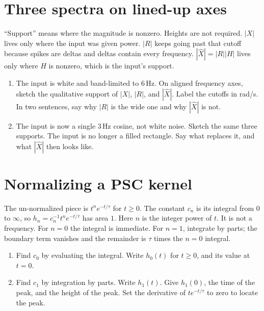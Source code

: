 \documentclass[11pt,letterpaper]{article}
\begin{document}
\section{Three spectra on lined-up axes}

\begin{idea}
``Support'' means where the magnitude is nonzero. Heights are not required. $|X|$ lives only where the input was given power. $|R|$ keeps going past that cutoff because spikes are deltas and deltas contain every frequency. $|\hat{X}| = |R||H|$ lives only where $H$ is nonzero, which is the input's support.
\end{idea}

\begin{enumerate}
\item The input is white and band-limited to $6\,\mathrm{Hz}$. On aligned frequency axes, sketch the qualitative support of $|X|$, $|R|$, and $|\hat{X}|$. Label the cutoffs in rad/s. In two sentences, say why $|R|$ is the wide one and why $|\hat{X}|$ is not.
\item The input is now a single $3\,\mathrm{Hz}$ cosine, not white noise. Sketch the same three supports. The input is no longer a filled rectangle. Say what replaces it, and what $|\hat{X}|$ then looks like.
\end{enumerate}

\section{Normalizing a PSC kernel}

\begin{idea}
The un-normalized piece is $t^n e^{-t/\tau}$ for $t \ge 0$. The constant $c_n$ is its integral from $0$ to $\infty$, so $h_n = c_n^{-1} t^n e^{-t/\tau}$ has area $1$. Here $n$ is the integer power of $t$. It is not a frequency. For $n = 0$ the integral is immediate. For $n = 1$, integrate by parts; the boundary term vanishes and the remainder is $\tau$ times the $n = 0$ integral.
\end{idea}

\begin{enumerate}
\item Find $c_0$ by evaluating the integral. Write $h_0(t)$ for $t \ge 0$, and its value at $t = 0$.
\item Find $c_1$ by integration by parts. Write $h_1(t)$. Give $h_1(0)$, the time of the peak, and the height of the peak. Set the derivative of $t e^{-t/\tau}$ to zero to locate the peak.
\end{enumerate}
\end{document}
